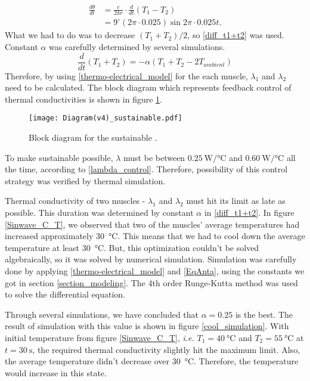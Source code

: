 \begin{equation} \label{theta_diff}
\begin{aligned} 
\frac{d\theta}{dt} & = \frac{c}{2kr}\cdot\frac{d}{dt}(T_{1}-T_{2}) \\
& = 9^{\circ}(2\pi\cdot 0.025)\sin{2\pi\cdot 0.025t}.
\end{aligned}
\end{equation}
What we had to do was to decrease $(T_{1}+T_{2})/2$, so \eqref{diff_t1+t2} was used. Constant $\alpha$ was carefully determined by several simulations.
\begin{equation} \label{diff_t1+t2}
\frac{d}{dt}(T_{1}+T_{2}) = -\alpha(T_{1}+T_{2}-2T_{ambient})
\end{equation}
Therefore, by using \eqref{thermo-electrical_model} for the each muscle, $\lambda_{1}$ and $\lambda_{2}$ need to be calculated. The block diagram which represents feedback control of thermal conductivities is shown in figure \ref{diagram_sustainable}.

\begin{figure}[t]
	\centering\texttt{[image: Diagram(v4)\_sustainable.pdf]}
	\caption{Block diagram for the sustainable \apcnospace.}
	\label{diagram_sustainable}
\end{figure}

To make sustainable \apc possible, $\lambda$ must be between $\SI{0.25}{\watt\per\degreeCelsius}$ and $\SI{0.60}{\watt\per\degreeCelsius}$  all the time, according to \eqref{lambda_control}. Therefore, possibility of this control strategy was verified by thermal simulation.

Thermal conductivity of two muscles - $\lambda_{1}$ and $\lambda_{2}$ must hit its limit as late as possible. 
This duration was determined by constant $\alpha$ in \eqref{diff_t1+t2}. 
In figure \ref{Sinwave_C_T}, we observed that two of the muscles' average temperatures had increased approximately \SI{30}{\degreeCelsius}. This means that we had to cool down the average temperature at least \SI{30}{\degreeCelsius}. 
But, this optimization couldn't be solved algebraically, so it was solved by numerical simulation.
Simulation was carefully done by applying \eqref{thermo-electrical_model} and \eqref{EqAnta}, using the constants we got in section \ref{section_modeling}. The 4th order Runge-Kutta method was used to solve the differential equation. 

Through several simulations, we have concluded that $\alpha = 0.25$ is the best. The result of simulation with this value is shown in figure \ref{cool_simulation}. With initial temperature from figure \ref{Sinwave_C_T}, {\it i.e.} $T_{1}=\SI{40}{\degreeCelsius}$ and $T_{2}=\SI{55}{\degreeCelsius}$ at $t=\SI{30}{\second}$, the required thermal conductivity slightly hit the maximum limit. Also, the average temperature didn't decrease over \SI{30}{\degreeCelsius}. Therefore, the temperature would increase in this state.

